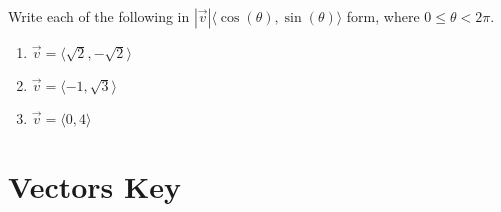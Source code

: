 Write each of the following in $|\vec{v}|\langle \cos(\theta), \sin(\theta)\rangle$ form, where $0 \leq \theta < 2\pi$.
\begin{multicols}{3}
\begin{enumerate}	\setcounter{enumi}{\value{Review}}
	\item $\vec{v} = \langle \sqrt{2}, -\sqrt{2} \rangle$
	\item $\vec{v} = \langle -1, \sqrt{3} \rangle$
	\item $\vec{v} = \langle 0, 4 \rangle$
\end{enumerate}	\setcounter{Review}{\value{enumi}}
\end{multicols}

\newpage

\section*{Vectors Key}

